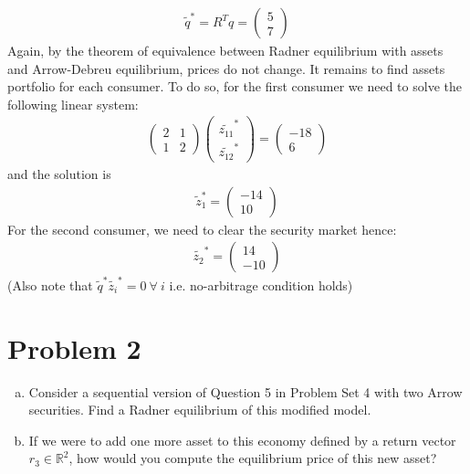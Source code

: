 \documentclass[a4paper]{article}
\begin{document}
\begin{enumerate}[(a)]
\begin{align*}
\tilde{q}^* = R^Tq = \begin{pmatrix}
5\\
7
\end{pmatrix}
\end{align*}
Again, by the theorem of equivalence between Radner equilibrium with assets and Arrow-Debreu equilibrium, prices do not change. It remains to find assets portfolio for each consumer. To do so, for the first consumer we need to solve the following linear system:
\begin{align*}
\begin{pmatrix}
2 & 1\\
1 & 2
\end{pmatrix} \begin{pmatrix}
\tilde{z_{11}}^*\\
\tilde{z_{12}}^*
\end{pmatrix} = \begin{pmatrix}
-18\\
6
\end{pmatrix}
\end{align*}
and the solution is 
\begin{align*}
\tilde{z}_1^* = \begin{pmatrix}
-14\\
10
\end{pmatrix}
\end{align*}
For the second consumer, we need to clear the security market hence:
\begin{align*}
\tilde{z_2}^* = \begin{pmatrix}
14\\
-10
\end{pmatrix}
\end{align*}
(Also note that $\tilde{q}^*\tilde{z_i}^* = 0\ \forall\ i$ i.e. no-arbitrage condition holds)
\end{enumerate}
\section*{Problem 2}
\begin{enumerate}[(a)]
\item Consider a sequential version of Question 5 in Problem Set 4 with two Arrow
securities. Find a Radner equilibrium of this modified model.
\item  If we were to add one more asset to this economy defined by a return vector $r_3 \in \mathbb{R}^2$,
how would you compute the equilibrium price of this new asset?

\end{enumerate}
\end{document}
